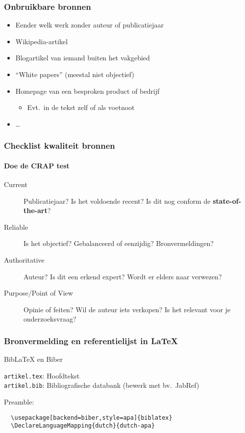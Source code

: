 \documentclass[aspectratio=169]{beamer}
\begin{document}
\begin{frame}
  \frametitle{Onbruikbare bronnen}
  
  \begin{itemize}
    \item Eender welk werk zonder auteur of publicatiejaar
    \item Wikipedia-artikel
    \item Blogartikel van iemand buiten het vakgebied
    \item ``White papers'' (meestal niet objectief)
    \item Homepage van een besproken product of bedrijf
    \begin{itemize}
      \item Evt.~in de tekst zelf of als voetnoot
    \end{itemize}
    \item \dots
  \end{itemize}
\end{frame}

\begin{frame}
  \frametitle{Checklist kwaliteit bronnen}
  \framesubtitle{Doe de CRAP test}
  
  \begin{description}
    \item[Current] Publicatiejaar? Is het voldoende recent? Is dit nog conform de \textbf{state-of-the-art}?
    \item[Reliable] Is het objectief? Gebalanceerd of eenzijdig? 
    Bronvermeldingen?
    \item[Authoritative] Auteur? Is dit een erkend expert? Wordt er elders naar verwezen?
    \item[Purpose/Point of View] Opinie of feiten? Wil de auteur iets verkopen? Is het relevant voor je onderzoeksvraag?
  \end{description}
  
\end{frame}

\begin{frame}[fragile]
  \frametitle{Bronvermelding en referentielijst in {\LaTeX}}
  
  Bib{\LaTeX} en Biber
  
  \vspace{18pt}
  
  \verb|artikel.tex|: Hoofdtekst\\
  \verb|artikel.bib|: Bibliografische databank (bewerk met bv.~JabRef)
  
  \vspace{18pt}
  
  Preamble:
  
  \begin{verbatim}
  \usepackage[backend=biber,style=apa]{biblatex}
  \DeclareLanguageMapping{dutch}{dutch-apa}
  
  \end{verbatim}
  
\end{frame}
\end{document}
